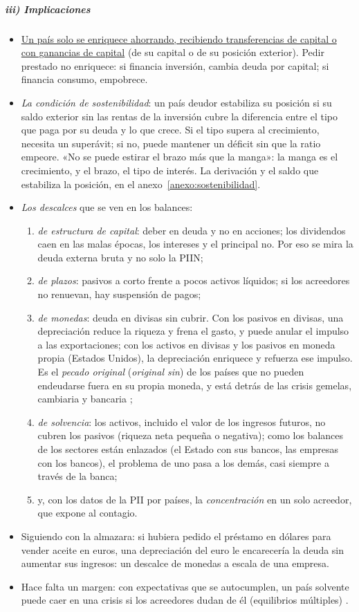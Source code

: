 \documentclass[11pt]{article}
\begin{document}
\subparagraph{iii) Implicaciones}
\begin{itemize}
\item \uline{Un país solo se enriquece ahorrando, recibiendo transferencias de capital o con ganancias de capital} (de su capital o de su posición exterior). Pedir prestado no enriquece: si financia inversión, cambia deuda por capital; si financia consumo, empobrece.
\item \emph{La condición de sostenibilidad}: un país deudor estabiliza su posición si su saldo exterior sin las rentas de la inversión cubre la diferencia entre el tipo que paga por su deuda y lo que crece. Si el tipo supera al crecimiento, necesita un superávit; si no, puede mantener un déficit sin que la ratio empeore. «No se puede estirar el brazo más que la manga»: la manga es el crecimiento, y el brazo, el tipo de interés. La derivación y el saldo que estabiliza la posición, en el anexo~\ref{anexo:sostenibilidad}.
\item \emph{Los descalces} que se ven en los balances\nocite{Allen2002Balances}:
  \begin{enumerate}
  \item \emph{de estructura de capital}: deber en deuda y no en acciones; los dividendos caen en las malas épocas, los intereses y el principal no. Por eso se mira la deuda externa bruta y no solo la PIIN;
  \item \emph{de plazos}: pasivos a corto frente a pocos activos líquidos; si los acreedores no renuevan, hay suspensión de pagos;
  \item \emph{de monedas}: deuda en divisas sin cubrir. Con los pasivos en divisas, una depreciación reduce la riqueza y frena el gasto, y puede anular el impulso a las exportaciones; con los activos en divisas y los pasivos en moneda propia (Estados Unidos), la depreciación enriquece y refuerza ese impulso. Es el \emph{pecado original} (\emph{original sin}) de los países que no pueden endeudarse fuera en su propia moneda\nocite{EHP2005PecadoOriginal}, y está detrás de las crisis gemelas, cambiaria y bancaria\nocite{KaminskyReinhart1999} ;
  \item \emph{de solvencia}: los activos, incluido el valor de los ingresos futuros, no cubren los pasivos (riqueza neta pequeña o negativa); como los balances de los sectores están enlazados (el Estado con sus bancos, las empresas con los bancos), el problema de uno pasa a los demás, casi siempre a través de la banca;
  \item y, con los datos de la PII por países, la \emph{concentración} en un solo acreedor, que expone al contagio.
  \end{enumerate}
\item Siguiendo con la almazara: si hubiera pedido el préstamo en dólares para vender aceite en euros, una depreciación del euro le encarecería la deuda sin aumentar sus ingresos: un descalce de monedas a escala de una empresa.
\item Hace falta un margen: con expectativas que se autocumplen, un país solvente puede caer en una crisis si los acreedores dudan de él (equilibrios múltiples)\nocite{Obstfeld1996} .
\end{itemize}
\end{document}
